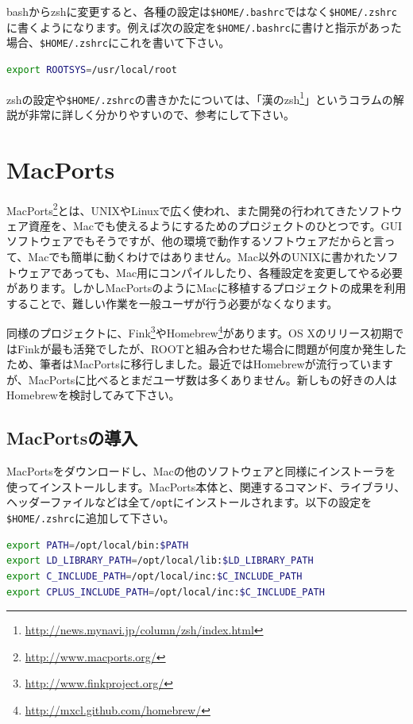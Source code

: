 bashからzshに変更すると、各種の設定は\texttt{\$HOME/.bashrc}ではなく\texttt{\$HOME/.zshrc}に書くようになります。例えば次の設定を\texttt{\$HOME/.bashrc}に書けと指示があった場合、\texttt{\$HOME/.zshrc}にこれを書いて下さい。

\begin{lstlisting}[language=bash]
export ROOTSYS=/usr/local/root
\end{lstlisting}

zshの設定や\texttt{\$HOME/.zshrc}の書きかたについては、「漢のzsh\footnote{\url{http://news.mynavi.jp/column/zsh/index.html}}」というコラムの解説が非常に詳しく分かりやすいので、参考にして下さい。

\section{MacPorts}
\label{sec_MacPorts}
MacPorts\footnote{\url{http://www.macports.org/}}とは、UNIXやLinuxで広く使われ、また開発の行われてきたソフトウェア資産を、Macでも使えるようにするためのプロジェクトのひとつです。GUIソフトウェアでもそうですが、他の環境で動作するソフトウェアだからと言って、Macでも簡単に動くわけではありません。Mac以外のUNIXに書かれたソフトウェアであっても、Mac用にコンパイルしたり、各種設定を変更してやる必要があります。しかしMacPortsのようにMacに移植するプロジェクトの成果を利用することで、難しい作業を一般ユーザが行う必要がなくなります。

同様のプロジェクトに、Fink\footnote{\url{http://www.finkproject.org/}}やHomebrew\footnote{\url{http://mxcl.github.com/homebrew/}}があります。OS Xのリリース初期ではFinkが最も活発でしたが、ROOTと組み合わせた場合に問題が何度か発生したため、筆者はMacPortsに移行しました。最近ではHomebrewが流行っていますが、MacPortsに比べるとまだユーザ数は多くありません。新しもの好きの人はHomebrewを検討してみて下さい。

\subsection{MacPortsの導入}

MacPortsをダウンロードし、Macの他のソフトウェアと同様にインストーラを使ってインストールします。MacPorts本体と、関連するコマンド、ライブラリ、ヘッダーファイルなどは全て\texttt{/opt}にインストールされます。以下の設定を\texttt{\$HOME/.zshrc}に追加して下さい。
\begin{lstlisting}[language=bash]
export PATH=/opt/local/bin:$PATH
export LD_LIBRARY_PATH=/opt/local/lib:$LD_LIBRARY_PATH
export C_INCLUDE_PATH=/opt/local/inc:$C_INCLUDE_PATH
export CPLUS_INCLUDE_PATH=/opt/local/inc:$C_INCLUDE_PATH
\end{lstlisting}

